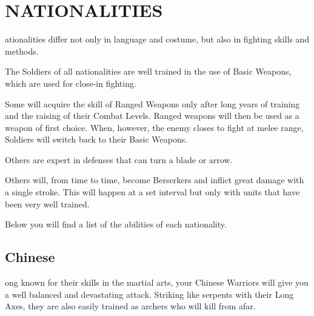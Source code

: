 
\chapter[Nationalities]{{\Huge N}ATIONALITIES}

ationalities differ not only in language and costume, but also in fighting skills and methods.

The Soldiers of all nationalities are well trained in the use of Basic Weapons, which are used for close-in fighting.

Some will acquire the skill of Ranged Weapons only after long years of training and the raising of their Combat Levels. Ranged weapons will then be used as a weapon of first choice. When, however, the enemy closes to fight at melee range, Soldiers will switch back to their Basic Weapons.

Others are expert in defenses that can turn a blade or arrow.

Others will, from time to time, become Berserkers and inflict great damage with a single stroke. This will happen at a set interval but only with units that have been very well trained.

Below you will find a list of the abilities of each nationality.

\clearpage %

\section{Chinese}


ong known for their skills in the martial arts, your Chinese Warriors will give you a well balanced and devastating attack. Striking like serpents with their Long Axes, they are also easily trained as archers who will kill from afar.

